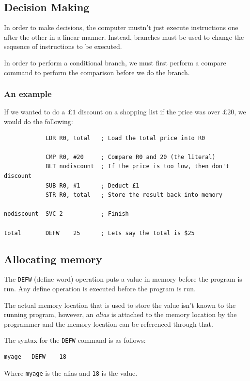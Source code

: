 \documentclass{article}
\begin{document}
\subsection{Decision Making}

In order to make decisions, the computer mustn't just execute instructions one after the other in a linear manner. Instead, branches must be used to change the sequence of instructions to be executed.

In order to perform a conditional branch, we must first perform a compare command to perform the comparison before we do the branch.

\subsubsection{An example}

If we wanted to do a $£1$ discount on a shopping list if the price was over $£20$, we would do the following:

\begin{verbatim}
			LDR	R0, total	; Load the total price into R0
	
			CMP	R0, #20		; Compare R0 and 20 (the literal)
			BLT	nodiscount	; If the price is too low, then don't discount
			SUB	R0, #1		; Deduct £1
			STR	R0, total	; Store the result back into memory

nodiscount	SVC	2			; Finish

total 		DEFW	25		; Lets say the total is $25
\end{verbatim}

\subsection{Allocating memory}

The \texttt{DEFW} (define word) operation puts a value in memory before the program is run. Any define operation is executed before the program is run.

The actual memory location that is used to store the value isn't known to the running program, however, an {\it alias} is attached to the memory location by the programmer and the memory location can be referenced through that.

The syntax for the \texttt{DEFW} command is as follows:

\begin{verbatim}
myage	DEFW	18
\end{verbatim}

Where {\tt myage} is the alias and {\tt 18} is the value.
\end{document}
